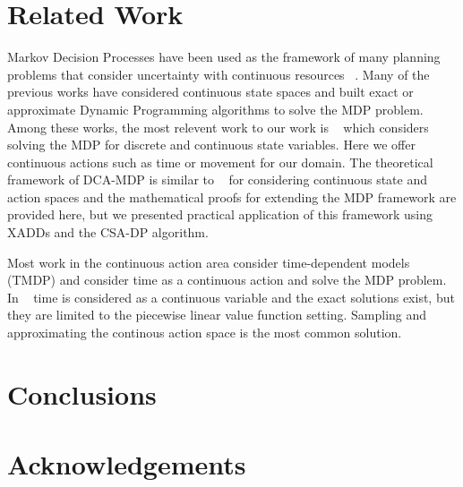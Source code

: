 \documentclass[letterpaper]{article}
\begin{document}
\section{Related Work}
Markov Decision Processes have been used as the framework of many planning problems that consider uncertainty with continuous resources ~\cite{bresina02}. Many of the previous works have considered continuous state spaces and built exact or approximate Dynamic Programming algorithms to solve the MDP problem. Among these works, the most relevent work to our work is ~\cite{sanner11} which considers solving the MDP for discrete and continuous state variables. 
Here we offer continuous actions such as time or movement for our domain. The theoretical framework of DCA-MDP is similar to ~\cite{Rachelson08} for considering continuous state and action spaces and the mathematical proofs for extending the MDP framework are provided here, but we presented practical application of this framework using XADDs and the CSA-DP algorithm. 

Most work in the continuous action area consider time-dependent models (TMDP) and consider time as a continuous action and solve the MDP problem. In ~\cite{boyan00} time is considered as a continuous variable and the exact solutions exist, but they are limited to the piecewise linear value function setting. 
Sampling \cite{Weinstein2010} and approximating \cite{pegasus} the continous action space is the most common solution. 

\section{Conclusions}



\section*{Acknowledgements}




\end{document}
